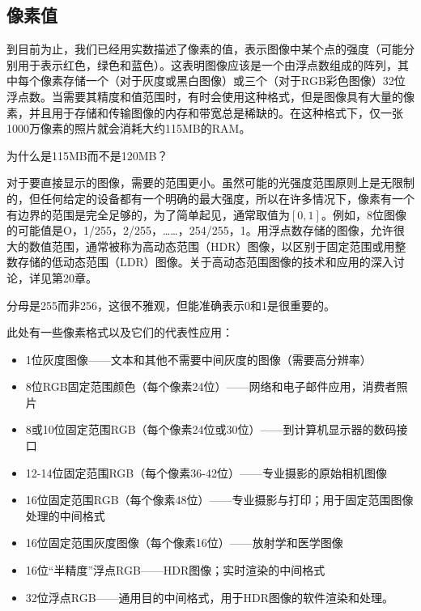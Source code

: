 \documentclass[lang=cn,12pt]{elegantbook}
\begin{document}
\subsection{像素值}

到目前为止，我们已经用实数描述了像素的值，表示图像中某个点的强度（可能分别用于表示红色，绿色和蓝色）。这表明图像应该是一个由浮点数组成的阵列，其中每个像素存储一个（对于灰度或黑白图像）或三个（对于RGB彩色图像）32位浮点数。当需要其精度和值范围时，有时会使用这种格式，但是图像具有大量的像素，并且用于存储和传输图像的内存和带宽总是稀缺的。在这种格式下，仅一张1000万像素的照片就会消耗大约115MB的RAM。

\begin{note}
为什么是115MB而不是120MB？
\end{note}

对于要直接显示的图像，需要的范围更小。虽然可能的光强度范围原则上是无限制的，但任何给定的设备都有一个明确的最大强度，所以在许多情况下，像素有一个有边界的范围是完全足够的，为了简单起见，通常取值为$[0,1]$。例如，8位图像的可能值是O，1/255，2/255，……，254/255，1。用浮点数存储的图像，允许很大的数值范围，通常被称为高动态范围（HDR）图像，以区别于固定范围或用整数存储的低动态范围（LDR）图像。关于高动态范围图像的技术和应用的深入讨论，详见第20章。

\begin{note}
分母是255而非256，这很不雅观，但能准确表示0和1是很重要的。
\end{note}

此处有一些像素格式以及它们的代表性应用：

\begin{itemize}
  \item 1位灰度图像——文本和其他不需要中间灰度的图像（需要高分辨率）
  \item 8位RGB固定范围颜色（每个像素24位）——网络和电子邮件应用，消费者照片
  \item 8或10位固定范围RGB（每个像素24位或30位）——到计算机显示器的数码接口
  \item 12-14位固定范围RGB（每个像素36-42位）——专业摄影的原始相机图像
  \item 16位固定范围RGB（每个像素48位）——专业摄影与打印；用于固定范围图像处理的中间格式
  \item 16位固定范围灰度图像（每个像素16位）——放射学和医学图像
  \item 16位“半精度”浮点RGB——HDR图像；实时渲染的中间格式
  \item 32位浮点RGB——通用目的中间格式，用于HDR图像的软件渲染和处理。
\end{itemize}
\end{document}
